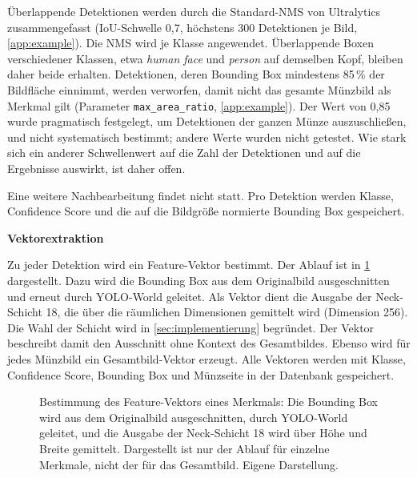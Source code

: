 \noindent Überlappende Detektionen werden durch die Standard-NMS von Ultralytics zusammengefasst (IoU-Schwelle 0{,}7, höchstens 300 Detektionen je Bild, \cref{app:example}). Die NMS wird je Klasse angewendet. Überlappende Boxen verschiedener Klassen, etwa \textit{human face} und \textit{person} auf demselben Kopf, bleiben daher beide erhalten. Detektionen, deren Bounding Box mindestens 85\,\% der Bildfläche einnimmt, werden verworfen, damit nicht das gesamte Münzbild als Merkmal gilt (Parameter \texttt{max\_area\_ratio}, \cref{app:example}). Der Wert von 0,85 wurde pragmatisch festgelegt, um Detektionen der ganzen Münze auszuschließen, und nicht systematisch bestimmt; andere Werte wurden nicht getestet. Wie stark sich ein anderer Schwellenwert auf die Zahl der Detektionen und auf die Ergebnisse auswirkt, ist daher offen. 

Eine weitere Nachbearbeitung findet nicht statt. Pro Detektion werden Klasse, Confidence Score und die auf die Bildgröße normierte Bounding Box gespeichert.

\vspace{\baselineskip}

\noindent \textbf{Vektorextraktion}

\noindent Zu jeder Detektion wird ein Feature-Vektor bestimmt. Der Ablauf ist in \cref{fig:vektorextraktion} dargestellt. Dazu wird die Bounding Box aus dem Originalbild ausgeschnitten und erneut durch YOLO-World geleitet. Als Vektor dient die Ausgabe der Neck-Schicht 18, die über die räumlichen Dimensionen gemittelt wird (Dimension 256). Die Wahl der Schicht wird in \cref{sec:implementierung} begründet. Der Vektor beschreibt damit den Ausschnitt ohne Kontext des Gesamtbildes. Ebenso wird für jedes Münzbild ein Gesamtbild-Vektor erzeugt. Alle Vektoren werden mit Klasse, Confidence Score, Bounding Box und Münzseite in der Datenbank gespeichert.

\begin{figure}[H]
  \centering
  \resizebox{\linewidth}{!}{}
  \caption[Ablauf der Vektorextraktion]{Bestimmung des Feature-Vektors eines Merkmals: Die Bounding Box wird aus dem Originalbild ausgeschnitten, durch YOLO-World geleitet, und die Ausgabe der Neck-Schicht 18 wird über Höhe und Breite gemittelt. Dargestellt ist nur der Ablauf für einzelne Merkmale, nicht der für das Gesamtbild. Eigene Darstellung.}
  \label{fig:vektorextraktion}
\end{figure}

\vspace{\baselineskip}

